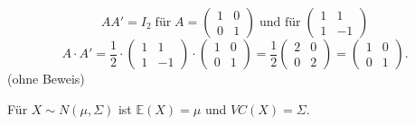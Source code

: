 \documentclass[10pt]{article}
\newcommand{\EW}{\mathbb{E}} %
\begin{document}
\begin{Bemerkung}
\begin{itemize}
					\begin{equation*}
						AA' = I_2 \; \text{für} \; A = \begin{pmatrix}
							1 & 0\\ 0& 1
						\end{pmatrix} \; \text{und für} \; \begin{pmatrix}
						1 & 1 \\ 1 & -1
						\end{pmatrix}
					\end{equation*}
					\begin{equation*}
						A \cdot A' = \frac{1}{2} \cdot \begin{pmatrix}
							1 & 1 \\ 1 & -1
						\end{pmatrix} \cdot \begin{pmatrix}
						1 & 0\\ 0& 1
						\end{pmatrix} = \frac{1}{2} \begin{pmatrix}
						2 & 0 \\ 0& 2
						\end{pmatrix} = \begin{pmatrix}
						1 & 0 \\ 0& 1
						\end{pmatrix}.
					\end{equation*}
					(ohne Beweis)
				\end{itemize}
			\end{Bemerkung}
			\begin{Proposition}
				Für $X \sim N(\mu,\Sigma)$ ist $\EW(X) = \mu$ und $VC(X)=\Sigma$.
			\end{Proposition}
\end{document}
